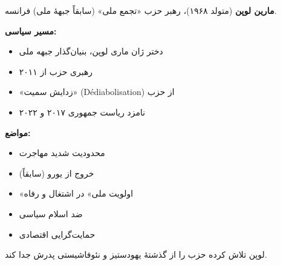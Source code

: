 \begin{tcolorbox}[
    enhanced,
    colback=gray!5,
    colframe=darkgray,
    boxrule=2pt,
    arc=10pt,
    shadow={2mm}{-2mm}{0mm}{black!30},
    fonttitle=\bfseries\large,
    title={\rl{👤 پرترهٔ سیاستمدار: مارین لوپن}}
]

\textbf{مارین لوپن} (متولد ۱۹۶۸)، رهبر حزب «تجمع ملی» (سابقاً جبههٔ ملی) فرانسه.

\textbf{مسیر سیاسی:}
\begin{itemize}
    \item دختر ژان ماری لوپن، بنیان‌گذار جبهه ملی
    \item رهبری حزب از ۲۰۱۱
    \item «زدایش سمیت» (Dédiabolisation) از حزب
    \item نامزد ریاست جمهوری ۲۰۱۷ و ۲۰۲۲
\end{itemize}



\textbf{مواضع:}
\begin{itemize}
    \item محدودیت شدید مهاجرت
    \item خروج از یورو (سابقاً)
    \item «اولویت ملی» در اشتغال و رفاه
    \item ضد اسلام سیاسی
    \item حمایت‌گرایی اقتصادی
\end{itemize}

لوپن تلاش کرده حزب را از گذشتهٔ یهودستیز و نئوفاشیستی پدرش جدا کند.

\end{tcolorbox}

\vspace{5mm}

